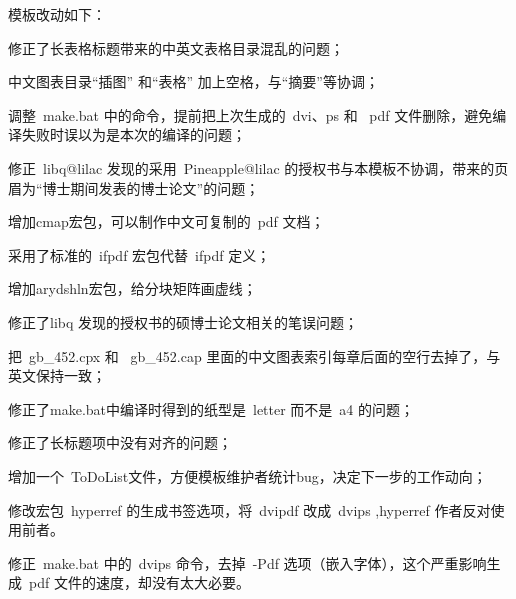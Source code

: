 模板改动如下：
\begin{hitlist}
 \item 修正了长表格标题带来的中英文表格目录混乱的问题；
 \item 中文图表目录``插图'' 和``表格'' 加上空格，与``摘要''等协调；
 \item 调整~make.bat 中的命令，提前把上次生成的~dvi、ps 和~ pdf 文件删除，避免编译失败时误以为是本次的编译的问题；
 \item 修正~libq@lilac 发现的采用~Pineapple@lilac 的授权书与本模板不协调，带来的页眉为“博士期间发表的博士论文”的问题；
 \item 增加cmap宏包，可以制作中文可复制的~pdf 文档；
 \item 采用了标准的~ifpdf 宏包代替~ifpdf 定义；
 \item 增加arydshln宏包，给分块矩阵画虚线；
 \item 修正了libq 发现的授权书的硕博士论文相关的笔误问题；
 \item 把~gb\_452.cpx 和 ~gb\_452.cap 里面的中文图表索引每章后面的空行去掉了，与英文保持一致；
 \item 修正了make.bat中编译时得到的纸型是~letter 而不是~a4 的问题；
 \item 修正了长标题项中没有对齐的问题；
 \item 增加一个~ToDoList文件，方便模板维护者统计bug，决定下一步的工作动向；
 \item 修改宏包~hyperref 的生成书签选项，将~dvipdf 改成~dvips ,hyperref 作者反对使用前者。
 \item 修正~make.bat 中的~dvips 命令，去掉~-Pdf 选项（嵌入字体），这个严重影响生成~pdf 文件的速度，却没有太大必要。
\end{hitlist}


